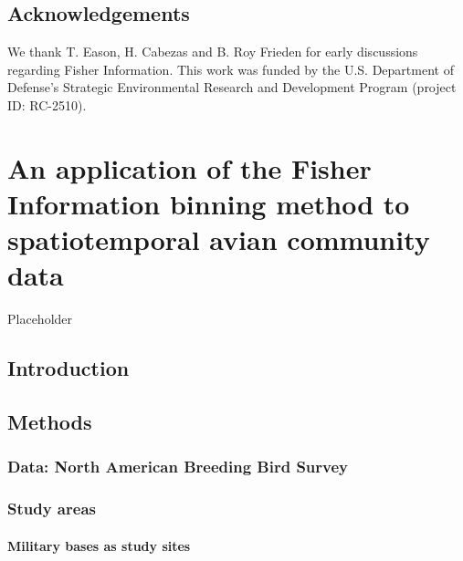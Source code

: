 \documentclass[12pt,twoside]{reedthesis}
\begin{document}
\hypertarget{acknowledgements-1}{%
\section{Acknowledgements}\label{acknowledgements-1}}

We thank T. Eason, H. Cabezas and B. Roy Frieden for early discussions regarding Fisher Information. This work was funded by the U.S. Department of Defense's Strategic Environmental Research and Development Program (project ID: RC-2510).

\hypertarget{an-application-of-the-fisher-information-binning-method-to-spatiotemporal-avian-community-data}{%
\chapter{An application of the Fisher Information binning method to spatiotemporal avian community data}\label{an-application-of-the-fisher-information-binning-method-to-spatiotemporal-avian-community-data}}

Placeholder

\hypertarget{introduction-2}{%
\section{Introduction}\label{introduction-2}}

\hypertarget{methods-2}{%
\section{Methods}\label{methods-2}}

\hypertarget{data-north-american-breeding-bird-survey}{%
\subsection{Data: North American Breeding Bird Survey}\label{data-north-american-breeding-bird-survey}}

\hypertarget{study-areas}{%
\subsection{Study areas}\label{study-areas}}

\hypertarget{military-bases-as-study-sites}{%
\subsubsection{Military bases as study sites}\label{military-bases-as-study-sites}}
\end{document}
